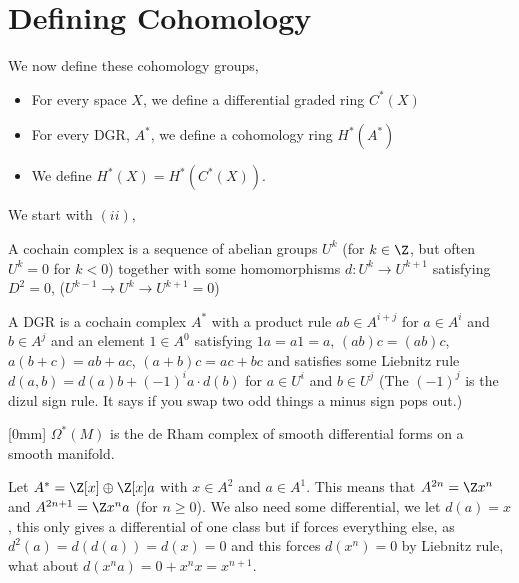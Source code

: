 \section{Defining Cohomology}

We now define these cohomology groups,
\begin{itemize}
  \item For every space $X$, we define a differential graded ring $C^*(X)$
  \item For every DGR, $A^*$, we define a cohomology ring $H^*(A^*)$
  \item We define $H^*(X) = H^*(C^*(X))$.
\end{itemize}
We start with $(ii)$,
\begin{ndefi}
  A cochain complex is a sequence of abelian groups $U^k$ (for $k \in \Z$, but often $U^k = 0$ for $k < 0$) together with some homomorphisms $d : U^k \to U^{k+1}$ satisfying $D^2 = 0$, ($U^{k-1} \to U^k \to U^{k+1} = 0$)
\end{ndefi}

\begin{ndefi}
  A DGR is a cochain complex $A^*$ with a product rule $ab \in A^{i+j}$ for $a \in A^i$ and $b \in A^j$ and an element $1 \in A^0$ satisfying $1a = a1 = a$, $(ab)c = (ab)c$, $a(b + c) = ab + ac$, $(a + b)c = ac + bc$ and satisfies some Liebnitz rule $d(a, b) = d(a)b + (-1)^ia \cdot d(b)$ for $a \in U^i$ and $b \in U^j$ (The $(-1)^j$ is the dizul sign rule. It says if you swap two odd things a minus sign pops out.)
\end{ndefi}

\begin{eg}[0mm]
  $\Omega^*(M)$ is the de Rham complex of smooth differential forms on a smooth manifold.
\end{eg}

\begin{eg}
  Let $A^* = \Z[x] \oplus \Z[x]a$ with $x \in A^2$ and $a \in A^1$. This means that $A^{2n} = \Z x^n$ and $A^{2n+1} = \Z x^n a$ (for $n \ge 0$). We also need some differential, we let $d(a) = x$, this only gives a differential of one class but if forces everything else, as $d^2(a) = d(d(a)) = d(x) = 0$ and this forces $d(x^n) = 0$ by Liebnitz rule, what about $d(x^n a) = 0 + x^nx = x^{n + 1}$.
\end{eg}

